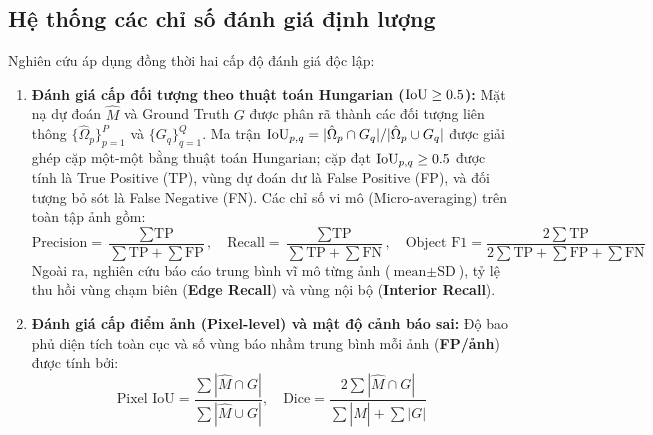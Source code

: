 \subsection{Hệ thống các chỉ số đánh giá định lượng}

Nghiên cứu áp dụng đồng thời hai cấp độ đánh giá độc lập:
\begin{enumerate}
    \item \textbf{Đánh giá cấp đối tượng theo thuật toán Hungarian ($\mathrm{IoU} \ge 0.5$):}
    Mặt nạ dự đoán $\hat{M}$ và Ground Truth $G$ được phân rã thành các đối tượng liên thông $\{\hat{\Omega}_p\}_{p=1}^P$ và $\{G_q\}_{q=1}^Q$. Ma trận $\mathrm{IoU}_{p, q} = |\hat{\Omega}_p \cap G_q| / |\hat{\Omega}_p \cup G_q|$ được giải ghép cặp một-một bằng thuật toán Hungarian; cặp đạt $\mathrm{IoU}_{p, q} \ge 0.5$ được tính là True Positive (TP), vùng dự đoán dư là False Positive (FP), và đối tượng bỏ sót là False Negative (FN). Các chỉ số vi mô (Micro-averaging) trên toàn tập ảnh gồm:
    \begin{equation}
    \text{Precision} = \frac{\sum \text{TP}}{\sum \text{TP} + \sum \text{FP}}, \quad \text{Recall} = \frac{\sum \text{TP}}{\sum \text{TP} + \sum \text{FN}}, \quad \text{Object F1} = \frac{2 \sum \text{TP}}{2 \sum \text{TP} + \sum \text{FP} + \sum \text{FN}}
    \end{equation}
    Ngoài ra, nghiên cứu báo cáo trung bình vĩ mô từng ảnh ($\text{mean} \pm \text{SD}$), tỷ lệ thu hồi vùng chạm biên (\textbf{Edge Recall}) và vùng nội bộ (\textbf{Interior Recall}).
    \item \textbf{Đánh giá cấp điểm ảnh (Pixel-level) và mật độ cảnh báo sai:}
    Độ bao phủ diện tích toàn cục và số vùng báo nhầm trung bình mỗi ảnh (\textbf{FP/ảnh}) được tính bởi:
    \begin{equation}
    \text{Pixel IoU} = \frac{\sum |\hat{M} \cap G|}{\sum |\hat{M} \cup G|}, \quad \text{Dice} = \frac{2 \sum |\hat{M} \cap G|}{\sum |\hat{M}| + \sum |G|}
    \end{equation}
\end{enumerate}
